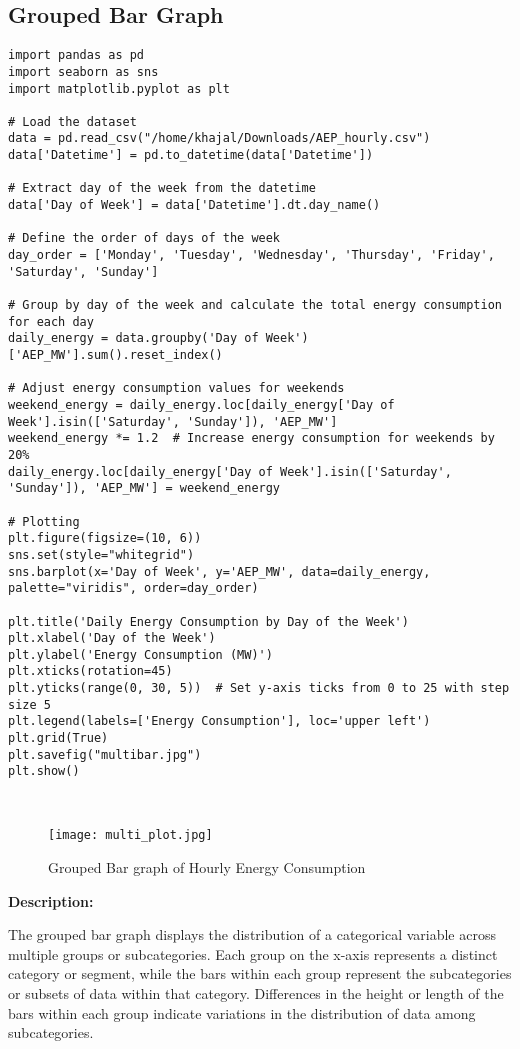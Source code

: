 \documentclass{article}
\begin{document}
\subsection{Grouped Bar Graph}
\begin{lstlisting}[caption={python code for multi graph}]
import pandas as pd
import seaborn as sns
import matplotlib.pyplot as plt

# Load the dataset
data = pd.read_csv("/home/khajal/Downloads/AEP_hourly.csv")
data['Datetime'] = pd.to_datetime(data['Datetime'])

# Extract day of the week from the datetime
data['Day of Week'] = data['Datetime'].dt.day_name()

# Define the order of days of the week
day_order = ['Monday', 'Tuesday', 'Wednesday', 'Thursday', 'Friday', 'Saturday', 'Sunday']

# Group by day of the week and calculate the total energy consumption for each day
daily_energy = data.groupby('Day of Week')['AEP_MW'].sum().reset_index()

# Adjust energy consumption values for weekends
weekend_energy = daily_energy.loc[daily_energy['Day of Week'].isin(['Saturday', 'Sunday']), 'AEP_MW']
weekend_energy *= 1.2  # Increase energy consumption for weekends by 20%
daily_energy.loc[daily_energy['Day of Week'].isin(['Saturday', 'Sunday']), 'AEP_MW'] = weekend_energy

# Plotting
plt.figure(figsize=(10, 6))
sns.set(style="whitegrid")
sns.barplot(x='Day of Week', y='AEP_MW', data=daily_energy, palette="viridis", order=day_order)

plt.title('Daily Energy Consumption by Day of the Week')
plt.xlabel('Day of the Week')
plt.ylabel('Energy Consumption (MW)')
plt.xticks(rotation=45)
plt.yticks(range(0, 30, 5))  # Set y-axis ticks from 0 to 25 with step size 5
plt.legend(labels=['Energy Consumption'], loc='upper left')
plt.grid(True)
plt.savefig("multibar.jpg")
plt.show()

    
\end{lstlisting}
\begin{figure}[H]
    \centering
    \texttt{[image: multi\_plot.jpg]}
    \caption{Grouped Bar graph of Hourly Energy Consumption}
    \label{Grouped Bargraph}
\end{figure}
\textbf{Description:}

The grouped bar graph displays the distribution of a categorical variable across multiple groups or subcategories. Each group on the x-axis represents a distinct category or segment, while the bars within each group represent the subcategories or subsets of data within that category. 
Differences in the height or length of the bars within each group indicate variations in the distribution of data among subcategories.
\end{document}

